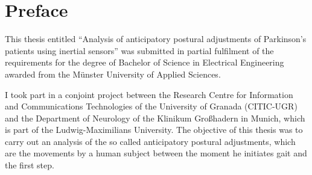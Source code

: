 \chapter*{Preface}

This thesis entitled ``Analysis of anticipatory postural adjustments of Parkinson's patients using inertial sensors'' was submitted in partial fulfilment of the requirements for the degree of Bachelor of Science in Electrical Engineering awarded from the Münster University of Applied Sciences.

I took part in a conjoint project between the Research Centre for Information and Communications Technologies of the University of Granada (CITIC-UGR) and the Department of Neurology of the Klinikum Großhadern in Munich, which is part of the Ludwig-Maximilians University. The objective of this thesis was to carry out an analysis of the so called anticipatory postural adjustments, which are the movements by a human subject between the moment he initiates gait and the first step.
